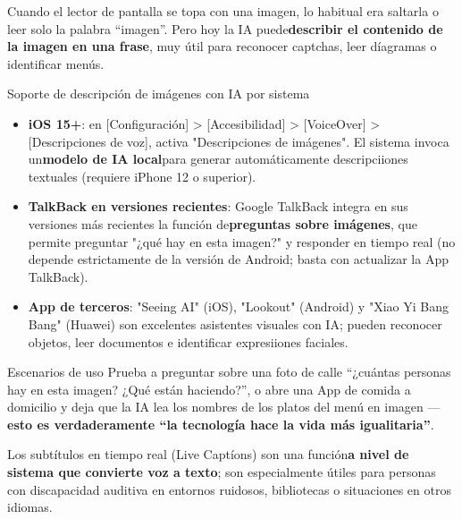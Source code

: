 
Cuando el lector de pantalla se topa con una imagen, lo habitual era saltarla o leer solo la palabra “imagen”. Pero hoy la IA puede\textbf{describir el contenido de la imagen en una frase}, muy útil para reconocer captchas, leer díagramas o identificar menús.

\begin{tcbinfo}{Soporte de descripción de imágenes con IA por sistema}
\begin{itemize}
  \item \textbf{iOS 15+}: en [Configuración] > [Accesibilidad] > [VoiceOver] > [Descripciones de voz], activa "Descripciones de imágenes". El sistema invoca un\textbf{modelo de IA local}para generar automáticamente descripciiones textuales (requiere iPhone 12 o superior).
  \item \textbf{TalkBack en versiones recientes}: Google TalkBack integra en sus versiones más recientes la función de\textbf{preguntas sobre imágenes}, que permite preguntar "¿qué hay en esta imagen?" y responder en tiempo real (no depende estrictamente de la versión de Android; basta con actualizar la App TalkBack).
  \item \textbf{App de terceros}: "Seeing AI" (iOS), "Lookout" (Android) y "Xiao Yi Bang Bang" (Huawei) son excelentes asistentes visuales con IA; pueden reconocer objetos, leer documentos e identificar expresiiones faciales.
\end{itemize}

\end{tcbinfo}

\begin{tcbpractice}{Escenarios de uso}
Prueba a preguntar sobre una foto de calle “¿cuántas personas hay en esta imagen? ¿Qué están haciendo?”, o abre una App de comida a domicilio y deja que la IA lea los nombres de los platos del menú en imagen —\textbf{esto es verdaderamente “la tecnología hace la vida más igualitaria”}.

\end{tcbpractice}


Los subtítulos en tiempo real (Live Captíons) son una función\textbf{a nivel de sistema que convierte voz a texto}; son especialmente útiles para personas con discapacidad auditiva en entornos ruidosos, bibliotecas o situaciones en otros idiomas.

